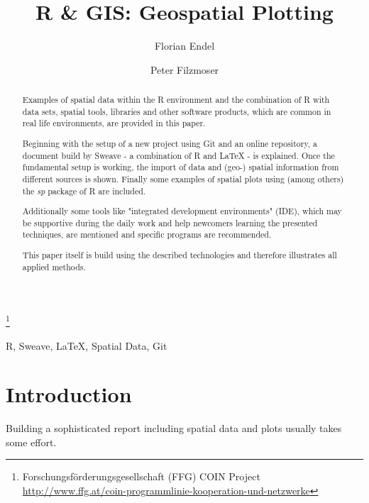 \documentclass{ifacconf}
\begin{document}
\begin{frontmatter}

\title{R \& GIS: Geospatial Plotting} 

\thanks[footnoteinfo]{Forschungsförderungsgesellschaft (FFG) COIN Project
\url{http://www.ffg.at/coin-programmlinie-kooperation-und-netzwerke}}

\author[First]{Florian Endel} 
\author[Second]{Peter Filzmoser} 

\address[First]{FFG IFEDH project, Student at Vienna University of Technology (e-mail: florian@endel.at).}
\address[Second]{Department of Statistics and Probability Theory,
Vienna University of Technology (e-mail: P.Filzmoser@tuwien.ac.at)}

\begin{abstract}                %
Examples of spatial data within the R environment and the 
combination of R with data sets, spatial
tools, libraries and other software products, which are common 
in real life environments, are provided in this paper.

Beginning with the setup of a new project using Git 
and an online repository, a document build by Sweave - a
combination of R and \LaTeX{} - is explained. Once the 
fundamental setup is working, the import
of data and (geo-) spatial information from different 
sources is shown. Finally some examples of spatial plots
using (among others) the \textit{sp} package of R are included.

Additionally some tools like "integrated development environments" (IDE), 
which may be supportive during the daily work
and help newcomers learning the presented techniques, 
are mentioned and specific programs are recommended.

This paper itself is build using the described technologies and therefore illustrates 
all applied methods. 
\end{abstract}

\begin{keyword}
R, Sweave, \LaTeX{}, Spatial Data, Git
\end{keyword}

\end{frontmatter}

\section{Introduction}
Building a sophisticated report including spatial data and plots 
usually takes some effort.
\end{document}
